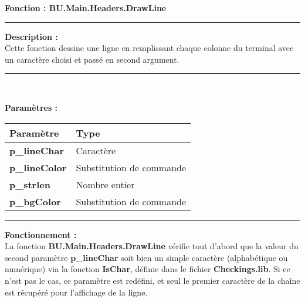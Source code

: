 \documentclass[a4paper,10pt]{article}
\begin{document}
    \textbf{Fonction : \color{func}BU.Main.Headers.DrawLine}\setlength{\parskip}{1em}


    \par\noindent\rule{\textwidth}{0.4pt}

    \begin{justify}
        \textbf{Description :}\\[1\baselineskip]
        Cette fonction dessine une ligne en remplissant chaque colonne du terminal avec un caractère choisi et passé en second argument.
    \end{justify}


    \par\noindent\rule{\textwidth}{0.4pt}\\

    \begin{justify}
        \textbf{Paramètres :}

        \begin{tabular}{|l|l|}
            \hline
            \textbf{Paramètre} & \textbf{Type}\\
            \hline
            \textbf{\color{vars}p\_lineChar} & Caractère\\
            \hline
            \textbf{\color{vars}p\_lineColor} & Substitution de commande\\
            \hline
            \textbf{\color{vars}p\_strlen} & Nombre entier\\
            \hline
            \textbf{\color{vars}p\_bgColor} & Substitution de commande\\
            \hline
        \end{tabular}
    \end{justify}

    \setlength{\parskip}{2em}


    \par\noindent\rule{\textwidth}{0.4pt}\setlength{\parskip}{1em}

    \begin{justify}
        \textbf{Fonctionnement :}\\[1\baselineskip]
        La fonction \textbf{\color{func}BU.Main.Headers.DrawLine} vérifie tout d'abord que la valeur du second paramètre \textbf{\color{vars}p\_lineChar} soit bien un simple caractère (alphabétique ou numérique) via la fonction \textbf{\color{func}IsChar}, définie dans le fichier \textbf{\color{path}Checkings.lib}. Si ce n'est pas le cas, ce paramètre est redéfini, et seul le premier caractère de la chaîne est récupéré pour l'affichage de la ligne.
    \end{justify}
\end{document}
